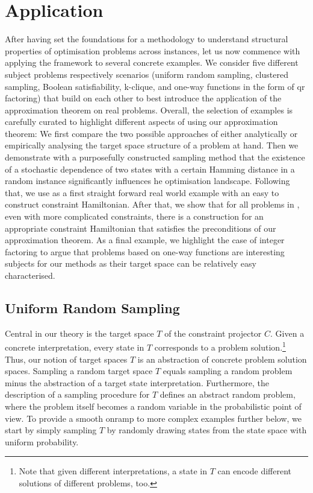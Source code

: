 \section{Application}
\label{sec:application}
After having set the foundations for a methodology to understand
structural properties of optimisation problems across instances, let us now
commence with applying the framework to several concrete examples. We consider five different subject problems respectively scenarios (uniform random sampling, clustered 
sampling,  Boolean satisfiability, k-clique, and one-way functions in the form of qr factoring) that build on each other to best introduce the application of the \QAOA approximation theorem on real problems. Overall, the selection of examples is carefully curated to highlight different aspects of using our approximation theorem: We first compare the two possible approaches of either analytically or empirically analysing the target space structure of a problem at hand. Then we demonstrate with a purposefully constructed sampling method that the existence of a stochastic dependence of two states with a certain Hamming distance in a random instance significantly influences he optimisation landscape. Following that, we use \SAT as a first straight forward real world example with an easy to construct constraint Hamiltonian. After that, we show that for all problems in \NP, even with more complicated constraints, there is a construction for an appropriate constraint Hamiltonian that satisfies the preconditions of our approximation theorem. As a final example, we highlight the case of integer factoring to argue that problems based on
one-way functions are interesting subjects for our methods as their target space can be relatively easy characterised.

\subsection{Uniform Random Sampling}
\label{sec:uniform_sampled}
Central in our theory is the target space $T$ of the constraint projector $C$. Given a concrete interpretation, every state in $T$ corresponds to a problem solution.\footnote{Note that given different interpretations, a state in $T$ can encode different solutions of different problems, too.} Thus, our notion of target spaces $T$ is an abstraction of concrete problem solution spaces. Sampling a random target space $T$ equals sampling a random problem minus the abstraction of a target state interpretation. Furthermore, the description of a sampling procedure for $T$ defines an abstract random problem, where the problem itself becomes a random variable in the probabilistic point of view. To provide a smooth onramp to more complex examples further below, we start by simply sampling $T$ by randomly drawing states from the state space with uniform probability.  

